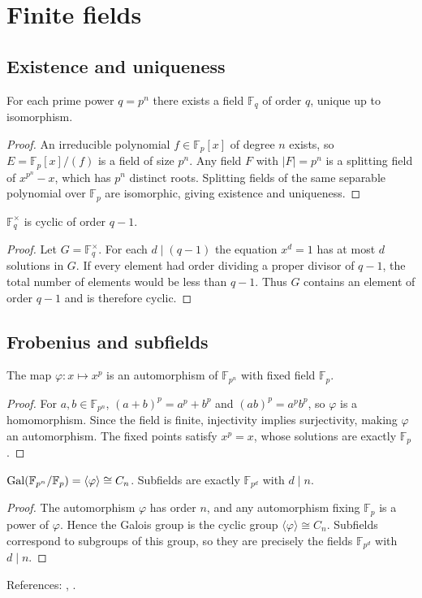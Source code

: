 \section{Finite fields}\label{sec:finite-fields}

\subsection{Existence and uniqueness}
\begin{theorem}
For each prime power $q=p^n$ there exists a field $\mathbb{F}_q$ of order $q$, unique up to isomorphism.
\end{theorem}
\begin{proof}
An irreducible polynomial $f\in\mathbb{F}_p[x]$ of degree $n$ exists, so $E=\mathbb{F}_p[x]/(f)$ is a field of size $p^n$. Any field $F$ with $|F|=p^n$ is a splitting field of $x^{p^n}-x$, which has $p^n$ distinct roots. Splitting fields of the same separable polynomial over $\mathbb{F}_p$ are isomorphic, giving existence and uniqueness.
\end{proof}
\begin{theorem}
$\mathbb{F}_q^\times$ is cyclic of order $q-1$.
\end{theorem}
\begin{proof}
Let $G=\mathbb{F}_q^\times$. For each $d\mid(q-1)$ the equation $x^d=1$ has at most $d$ solutions in $G$. If every element had order dividing a proper divisor of $q-1$, the total number of elements would be less than $q-1$. Thus $G$ contains an element of order $q-1$ and is therefore cyclic.
\end{proof}

\subsection{Frobenius and subfields}
\begin{proposition}[Frobenius]
The map $\varphi:x\mapsto x^p$ is an automorphism of $\mathbb{F}_{p^n}$ with fixed field $\mathbb{F}_p$.
\end{proposition}
\begin{proof}
For $a,b\in\mathbb{F}_{p^n}$, $(a+b)^p=a^p+b^p$ and $(ab)^p=a^pb^p$, so $\varphi$ is a homomorphism. Since the field is finite, injectivity implies surjectivity, making $\varphi$ an automorphism. The fixed points satisfy $x^p=x$, whose solutions are exactly $\mathbb{F}_p$.
\end{proof}
\begin{theorem}
$\operatorname{Gal}(\mathbb{F}_{p^n}/\mathbb{F}_p)=\langle \varphi\rangle\cong C_n$. Subfields are exactly $\mathbb{F}_{p^d}$ with $d\mid n$.
\end{theorem}
\begin{proof}
The automorphism $\varphi$ has order $n$, and any automorphism fixing $\mathbb{F}_p$ is a power of $\varphi$. Hence the Galois group is the cyclic group $\langle\varphi\rangle\cong C_n$. Subfields correspond to subgroups of this group, so they are precisely the fields $\mathbb{F}_{p^d}$ with $d\mid n$.
\end{proof}
References: \cite[\S13]{DF}, \cite[Ch.~VIII]{Lang}.

